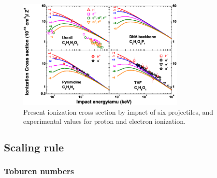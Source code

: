 \documentclass[preprint,12pt]{article}
\begin{document}
\begin{figure}[t!]
\centering
\includegraphics[width=0.75\textwidth]{figuras/Fig_finales/Fig3.eps}
\caption{Present ionization cross section by impact of six projectiles, 
and experimental values for proton and electron ionization.}
\label{fig:crossDNA_2}
\end{figure} 

\subsection{Scaling rule}
\subsubsection{Toburen numbers}
\end{document}
